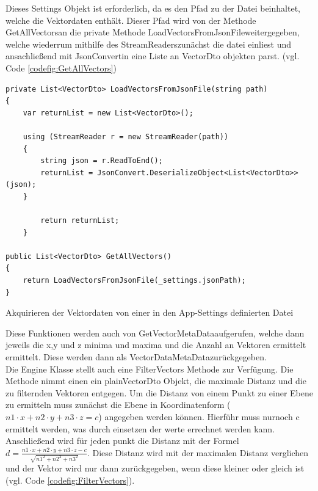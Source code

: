 Dieses Settings Objekt ist erforderlich, da es den Pfad zu der Datei beinhaltet, welche die Vektordaten enthält. Dieser Pfad wird von der Methode \grqq GetAllVectors\grqq\space an die private Methode \grqq LoadVectorsFromJsonFile\grqq\space weitergegeben, welche wiederrum mithilfe des \grqq StreamReaders\grqq\space zunächst die datei einliest und ansachließend mit \grqq JsonConvert\grqq\space in eine Liste an VectorDto objekten parst. (vgl. Code \ref{codefig:GetAllVectors})
\begin{codefig}
	\centering
	\lstset{style=sharpc}
	\begin{lstlisting}
private List<VectorDto> LoadVectorsFromJsonFile(string path)
{
	var returnList = new List<VectorDto>();

	using (StreamReader r = new StreamReader(path))
	{
		string json = r.ReadToEnd();
		returnList = JsonConvert.DeserializeObject<List<VectorDto>>(json);
	}

		return returnList;
	}

public List<VectorDto> GetAllVectors()
{
	return LoadVectorsFromJsonFile(_settings.jsonPath);
}
	\end{lstlisting}
	\caption{Akquirieren der Vektordaten von einer in den App-Settings definierten Datei}
	\label{codefig:GetAllVectors}
\end{codefig}
Diese Funktionen werden auch von \grqq GetVectorMetaData\grqq\space aufgerufen, welche dann jeweils die x,y und z minima und maxima und die Anzahl an Vektoren ermittelt ermittelt. Diese werden dann als \grqq VectorDataMetaData\grqq\space zurückgegeben.\\
Die Engine Klasse stellt auch eine FilterVectors Methode zur Verfügung. Die Methode nimmt einen ein plainVectorDto Objekt, die maximale Distanz und die zu filternden Vektoren entgegen. Um die Distanz von einem Punkt zu einer Ebene zu ermitteln muss zunächst die Ebene in Koordinatenform ($n1 \cdot x + n2 \cdot y + n3 \cdot z = c$) angegeben werden können. Hierführ muss nurnoch c ermittelt werden, was durch einsetzen der werte errechnet werden kann. Anschließend wird für jeden punkt die Distanz mit der Formel $d = \frac{n1 \cdot x + n2 \cdot y + n3 \cdot z - c}{\sqrt{n1^2 + n2^2 + n3^2}}$. Diese Distanz wird mit der maximalen Distanz verglichen und der Vektor wird nur dann zurückgegeben, wenn diese kleiner oder gleich ist (vgl. Code \ref{codefig:FilterVectors}).

